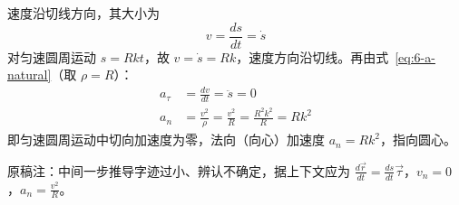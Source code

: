 \begin{solution}
速度沿切线方向，其大小为
\begin{equation}
  v = \frac{ds}{dt} = \dot{s}
  \label{eq:6-ex4-v}
\end{equation}
对匀速圆周运动 $s = Rkt$，故 $v = \dot{s} = Rk$，速度方向沿切线。再由式~\eqref{eq:6-a-natural}（取 $\rho = R$）：
\begin{equation}
  \begin{aligned}
    a_\tau &= \frac{dv}{dt} = \ddot{s} = 0 \\
    a_n &= \frac{v^2}{\rho} = \frac{v^2}{R} = \frac{R^2k^2}{R} = Rk^2
  \end{aligned}
  \label{eq:6-ex4-accel}
\end{equation}
即匀速圆周运动中切向加速度为零，法向（向心）加速度 $a_n = Rk^2$，指向圆心。
\begin{note}
原稿注：中间一步推导字迹过小、辨认不确定，据上下文应为
$\frac{d\vec{r}}{dt} = \frac{ds}{dt}\vec{\tau}$，$v_n = 0$，$a_n = \frac{v^2}{R}$。
\end{note}
\end{solution}
